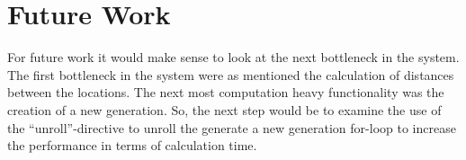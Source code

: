 
\chapter{Future Work}
For future work it would make sense to look at the next bottleneck in the system. The first bottleneck in the system were as mentioned the calculation of distances between the locations. The next most computation heavy functionality was the creation of a new generation. So, the next step would be to examine the use of the “unroll”-directive to unroll the generate a new generation for-loop to increase the performance in terms of calculation time. 
